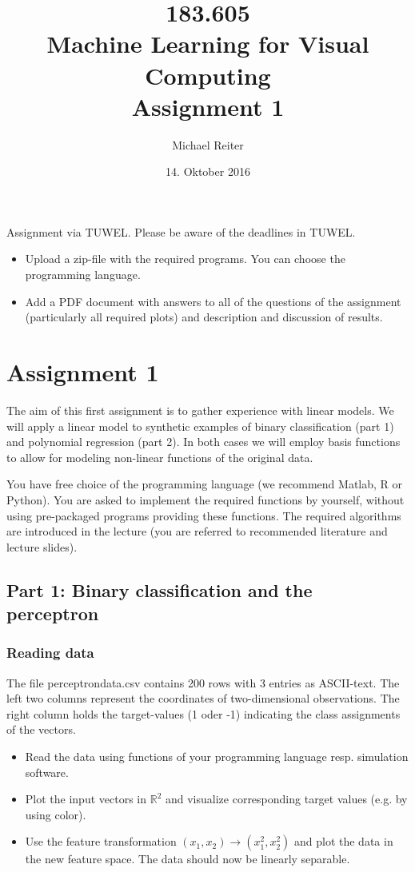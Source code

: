 \documentclass[a4]{article}
\title{\bf 183.605 \\ Machine Learning for Visual Computing \\ Assignment 1}
\author{Michael Reiter}
\date{14. Oktober 2016}
\begin{document}
\maketitle
\noindent
Assignment via TUWEL. Please be aware of the deadlines in TUWEL. \\
\begin{itemize}
\item Upload a zip-file with the required programs. You can choose the programming language.
\item Add a PDF document with answers to all of the questions of the assignment (particularly all required plots) and description and discussion of results. 
\end{itemize}

\section{Assignment 1}

The aim of this first assignment is to gather experience with linear models. We will apply a linear model to synthetic examples of binary classification (part 1) and polynomial regression (part 2). In both cases we will employ basis functions to allow for modeling non-linear functions of the original data.

You have free choice of the programming language (we recommend Matlab, R or Python).
You are asked to implement the required functions by yourself, without using pre-packaged programs  providing these functions. The required algorithms are introduced in the lecture (you are referred to recommended literature and lecture slides).

\subsection{Part 1: Binary classification and the perceptron}

\subsubsection{Reading data}\label{sec:readdata}

The file perceptrondata.csv contains 200 rows with 3 entries as ASCII-text. The left two columns represent the coordinates of two-dimensional observations. The right column holds the target-values  (1 oder -1) indicating the class assignments of the vectors.

\vspace{15mm}
\begin{itemize}
\item Read the data using functions of your programming language resp. simulation software.
\item Plot the input vectors in $\mathbb{R}^2$ and visualize corresponding target values (e.g. by using color). 
\item Use the feature transformation $(x_1,x_2) \rightarrow (x_1^2,x_2^2)$ and plot the data in the new feature space. The data should now be linearly separable.
\end{itemize}
\end{document}
